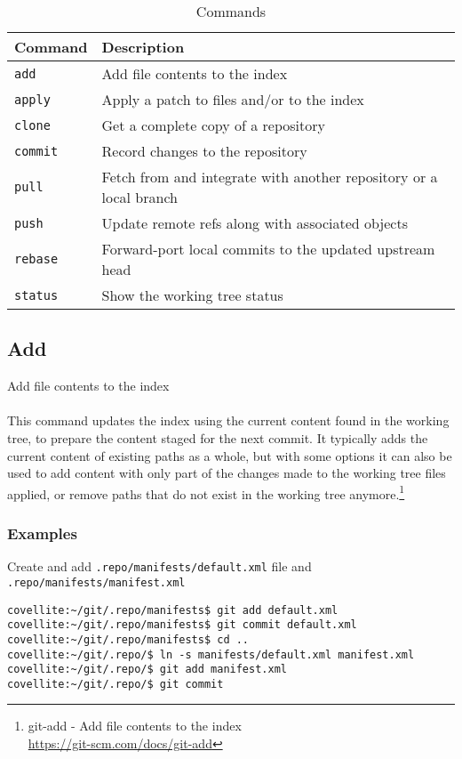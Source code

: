 \documentclass[12pt,letterpaper,dvips]{article}
\newcommand{\cmd}[1]{\texttt{#1}}
\begin{document}
\begin{table}[htb]
\begin{center}
\begin{tabular}{|p{}|p{}|}\hline
Command&Description\\
\hline
\cmd{add}&Add file contents to the index\\
\cmd{apply}&Apply a patch to files and/or to the index\\
\cmd{clone}&Get a complete copy of a repository\\
\cmd{commit}&Record changes to the repository\\
\cmd{pull}&Fetch from and integrate with another repository or a local branch\\
\cmd{push}&Update remote refs along with associated objects\\
\cmd{rebase}&Forward-port local commits to the updated upstream head\\
\cmd{status}&Show the working tree status\\
\hline
\end{tabular}
\caption {Commands}
\label{table:commands}
\end{center}
\end{table}


\subsection{Add}
Add file contents to the index
\\
\\
This command updates the index using the current content found in
the working tree, to prepare the content staged for the next
commit.  It typically adds the current content of existing paths
as a whole, but with some options it can also be used to add
content with only part of the changes made to the working tree
files applied, or remove paths that do not exist in the working
tree anymore.\footnote{git-add - Add file contents to the index\\
\href{https://git-scm.com/docs/git-add}{https://git-scm.com/docs/git-add}}


\subsubsection{Examples}
Create and add \cmd{.repo/manifests/default.xml} file and
\cmd{.repo/manifests/manifest.xml}
\begin{Verbatim}
covellite:~/git/.repo/manifests$ git add default.xml
covellite:~/git/.repo/manifests$ git commit default.xml
covellite:~/git/.repo/manifests$ cd ..
covellite:~/git/.repo/$ ln -s manifests/default.xml manifest.xml
covellite:~/git/.repo/$ git add manifest.xml
covellite:~/git/.repo/$ git commit
\end{Verbatim}
\end{document}
